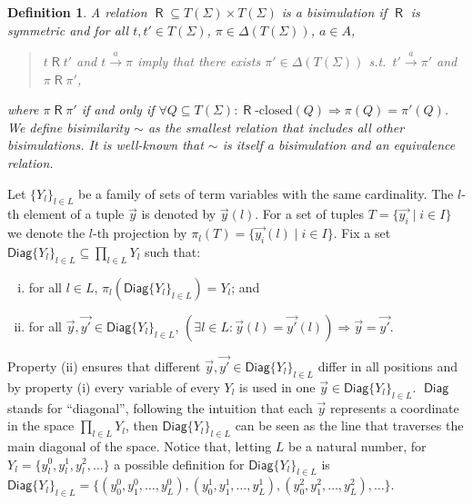 \documentclass[submission,copyright,creativecommons]{eptcs}
\newtheorem{definition}{Definition}
\newcommand{\trans}[1][]{\xrightarrow{\, {#1} \, }}
\newcommand{\closedTerms}{T(\Sigma)}
\newcommand{\Diag}{\mathop{\textsf{Diag}}}
\newcommand{\diag}[1]{\textsf{Diag}\{#1\}}
\newcommand{\limp}{\Rightarrow}
\newcommand{\bisim}{\sim}
\newcommand{\relR}{\mathrel{\textsf{R}}}
\newcommand{\closed}[1]{{#1}\text{-closed}}
\begin{document}
\begin{definition}
  A relation ${\relR} \subseteq \closedTerms \times \closedTerms$ is a
  bisimulation if ${\relR}$ is symmetric and for all $t, t' \in
  \closedTerms$, $\pi \in \Delta(\closedTerms)$, $a\in A$,
\begin{quote}
    $t \relR t'$ and $t \trans[a] \pi$ imply that there exists
    $\pi' \in \Delta(\closedTerms)$ s.t.\ $t' \trans[a] \pi'$ and
    $\pi \relR \pi'$,
  \end{quote}
where $\pi \relR \pi'$ if and only if $\forall Q \subseteq
  \closedTerms: \closed{\relR}(Q) \limp \pi(Q) = \pi'(Q)$.
We define bisimilarity $\bisim$ as the smallest relation that
  includes all other bisimulations.
It is well-known that $\bisim$ is itself a bisimulation and an
  equivalence relation.
\end{definition}

Let $\{Y_l\}_{l\in L}$ be a family of sets of term variables with the same cardinality.
The $l$-th element of a tuple $\vec{y}$  is denoted by $\vec{y}(l)$.  For a set of
tuples $T=\{\vec{y_i} \mid i\in I\}$ we denote the $l$-th projection by 
$\pi_l(T)=\{\vec{y_i}(l) \mid i\in I\}$.
Fix a set $\diag{Y_l}_{l\in L} \subseteq \prod_{l\in L} Y_l $ such that:
\begin{enumerate}[(i)]
\item for all $l \in L$, $\pi_l(\diag{Y_l}_{l\in L}) = Y_l$; and
\item for all $\vec{y}, \vec{y'} \in \diag{Y_l}_{l\in L}$, $(\exists l \in L :
  \vec{y}(l) = \vec{y'}(l)) \limp \vec{y} = \vec{y'}$.
\end{enumerate}
Property (ii) ensures that different $\vec{y}, \vec{y'} \in \diag{Y_l}_{l\in L}$ differ in all positions and by property (i) every variable of every $Y_l$ is used in one $\vec{y} \in \diag{Y_l}_{l\in L}$.
$\Diag$ stands for ``diagonal'', following the intuition that each
$\vec{y}$ represents a coordinate in the space $\prod_{l\in L} Y_l$,
then $\diag{Y_l}_{l\in L}$ can be seen as the line that traverses
the main diagonal of the space.
Notice that, letting $L$ be a natural number,  for $Y_l=\{y_l^0,y_l^1,y_l^2,\ldots\}$ a possible
definition for $\diag{Y_l}_{l\in L}$ is $\diag{Y_l}_{l\in L} =
\{(y_0^0,y_1^0,\ldots,y_L^0),(y_0^1,y_1^1,\ldots,y_L^1),(y_0^2,y_1^2,\ldots,y_L^2),\ldots\}$.
\end{document}
